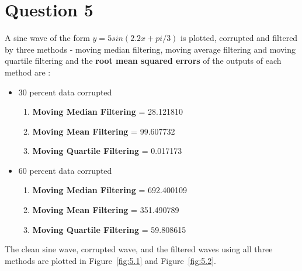 \documentclass[12pt]{article}
\begin{document}
\section{Question 5}
A sine wave of the form $y=5sin(2.2x + pi/3)$ is plotted, corrupted and filtered by three methods - moving median filtering, moving average filtering and moving quartile filtering and the \textbf{root mean squared errors} of the outputs of each method are : 
\begin{itemize}
\item 30 percent data corrupted
	\begin{enumerate}
	\item \textbf{Moving Median Filtering} = 28.121810
	\item \textbf{Moving Mean Filtering} = 99.607732
	\item \textbf{Moving Quartile Filtering} = 0.017173
	\end{enumerate}
\item 60 percent data corrupted
	\begin{enumerate}
	\item \textbf{Moving Median Filtering} = 692.400109
	\item \textbf{Moving Mean Filtering} = 351.490789
	\item \textbf{Moving Quartile Filtering} = 59.808615
	\end{enumerate}
\end{itemize}
The clean sine wave, corrupted wave, and the filtered waves using all three methods are plotted in Figure~\ref{fig:5.1} and Figure~\ref{fig:5.2}.
\end{document}
